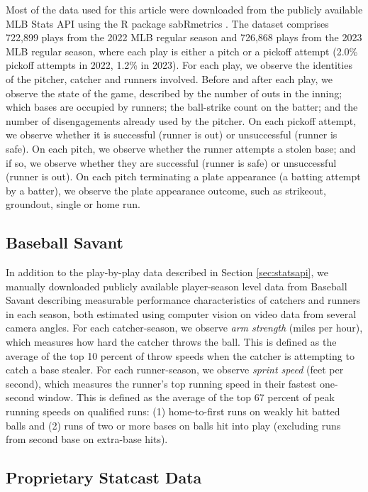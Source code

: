 \documentclass{article}
\begin{document}
      Most of the data used for this article were downloaded from the publicly available MLB Stats API using the R package sabRmetrics \parencite{powers_sabrmetrics_2025}. The dataset comprises 722,899 plays from the 2022 MLB regular season and 726,868 plays from the 2023 MLB regular season, where each play is either a pitch or a pickoff attempt (2.0\% pickoff attempts in 2022, 1.2\% in 2023). For each play, we observe the identities of the pitcher, catcher and runners involved. Before and after each play, we observe the state of the game, described by the number of outs in the inning; which bases are occupied by runners; the ball-strike count on the batter; and the number of disengagements already used by the pitcher. On each pickoff attempt, we observe whether it is successful (runner is out) or unsuccessful (runner is safe). On each pitch, we observe whether the runner attempts a stolen base; and if so, we observe whether they are successful (runner is safe) or unsuccessful (runner is out). On each pitch terminating a plate appearance (a batting attempt by a batter), we observe the plate appearance outcome, such as strikeout, groundout, single or home run.

    \subsection{Baseball Savant}
    \label{sec:baseballsavant}

      In addition to the play-by-play data described in Section \ref{sec:statsapi}, we manually downloaded publicly available player-season level data from Baseball Savant \parencite{baseball_savant_statcast_2024} describing measurable performance characteristics of catchers and runners in each season, both estimated using computer vision on video data from several camera angles. For each catcher-season, we observe {\it arm strength} (miles per hour), which measures how hard the catcher throws the ball. This is defined as the average of the top 10 percent of throw speeds when the catcher is attempting to catch a base stealer. For each runner-season, we observe {\it sprint speed} (feet per second), which measures the runner's top running speed in their fastest one-second window. This is defined as the average of the top 67 percent of peak running speeds on qualified runs: (1) home-to-first runs on weakly hit batted balls and (2) runs of two or more bases on balls hit into play (excluding runs from second base on extra-base hits).

    \subsection{Proprietary Statcast Data}
\end{document}
